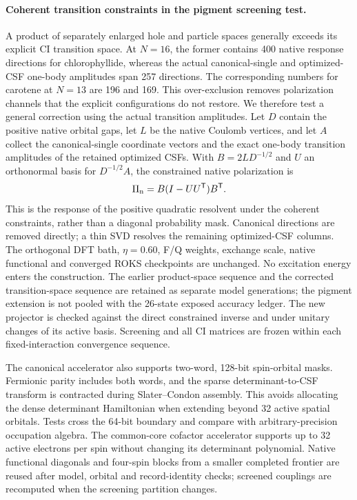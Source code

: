 \paragraph{Coherent transition constraints in the pigment screening test.}
A product of separately enlarged hole and particle spaces generally exceeds
its explicit CI transition space. At $N=16$, the former contains 400 native
response directions for chlorophyllide, whereas the actual canonical-single
and optimized-CSF one-body amplitudes span 257 directions. The corresponding
numbers for carotene at $N=13$ are 196 and 169. This over-exclusion removes
polarization channels that the explicit configurations do not restore.
We therefore test a general correction using the actual transition amplitudes.
Let $D$ contain the positive native orbital gaps, let $L$ be the native
Coulomb vertices, and let $A$ collect the canonical-single coordinate vectors
and the exact one-body transition amplitudes of the retained optimized CSFs.
With $B=2LD^{-1/2}$ and $U$ an orthonormal basis for $D^{-1/2}A$, the
constrained native polarization is
\begin{equation}
 \Pi_{\rm n}=B(I-UU^{\mathsf T})B^{\mathsf T}.
\end{equation}
This is the response of the positive quadratic resolvent under the coherent
constraints, rather than a diagonal probability mask. Canonical directions
are removed directly; a thin SVD resolves the remaining optimized-CSF
columns. The orthogonal DFT bath, $\eta=0.60$, F/Q weights, exchange scale,
native functional and converged ROKS checkpoints are unchanged. No excitation
energy enters the construction. The earlier product-space sequence and the
corrected transition-space sequence are retained as separate model generations;
the pigment extension is not pooled with the 26-state exposed accuracy ledger.
The new projector is checked against the direct constrained inverse and under
unitary changes of its active basis. Screening and all CI matrices are frozen
within each fixed-interaction convergence sequence.

The canonical accelerator also supports two-word, 128-bit spin-orbital
masks. Fermionic parity includes both words, and the sparse
determinant-to-CSF transform is contracted during Slater--Condon assembly.
This avoids allocating the dense determinant Hamiltonian when extending
beyond 32 active spatial orbitals. Tests cross the 64-bit boundary and
compare with arbitrary-precision occupation algebra. The common-core
cofactor accelerator supports up to 32 active electrons per spin without
changing its determinant polynomial. Native functional diagonals and
four-spin blocks from a smaller completed frontier are reused after model,
orbital and record-identity checks; screened couplings are recomputed when
the screening partition changes.

